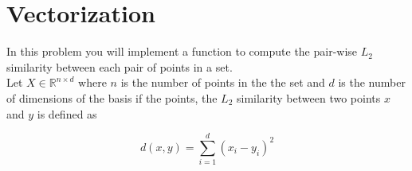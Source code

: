 \documentclass{article}
\begin{document}
\section{Vectorization}
In this problem you will implement a function to compute the pair-wise $L_2$ similarity between each pair of points in a set. \\
Let $X \in \mathbb{R}^{n \times d}$ where $n$ is the number of points in the the set and $d$ is the number of dimensions of the basis if the points, the $L_2$ similarity between two points $x$ and $y$ is defined as 

\begin{equation*}
    d(x,y) = \sum_{i=1}^d (x_i - y_i)^2
\end{equation*}

\end{document}
